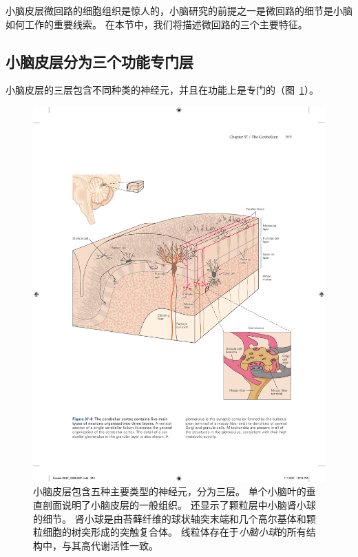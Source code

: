 小脑皮层微回路的细胞组织是惊人的，小脑研究的前提之一是微回路的细节是小脑如何工作的重要线索。
在本节中，我们将描述微回路的三个主要特征。



\subsection{小脑皮层分为三个功能专门层}

小脑皮层的三层包含不同种类的神经元，并且在功能上是专门的（图~\ref{fig:37_8}）。


\begin{figure}[htbp]
	\centering
	\includegraphics[width=1.0\linewidth]{chap37/fig_37_8}
	\caption{小脑皮层包含五种主要类型的神经元，分为三层。
		单个小脑叶的垂直剖面说明了小脑皮层的一般组织。
		还显示了颗粒层中小脑肾小球的细节。
		肾小球是由苔藓纤维的球状轴突末端和几个高尔基体和颗粒细胞的树突形成的突触复合体。
		线粒体存在于\textit{小脑小球}的所有结构中，与其高代谢活性一致。}
	\label{fig:37_8}
\end{figure}


